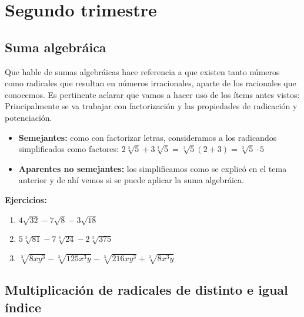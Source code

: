 \documentclass[a4paper]{article}
\begin{document}
\section{Segundo trimestre}
\subsection{Suma algebráica}
Que hable de sumas algebráicas hace referencia a que existen tanto números como radicales que resultan en números irracionales, aparte de los racionales que conocemos. Es pertinente aclarar que vamos a hacer uso de los ítems antes vistos:\\
Principalmente se va trabajar con factorización y las propiedades de radicación y potenciación.
\begin{itemize}
    \item \textbf{Semejantes:} como con factorizar letras, consideramos a los radicandos simplificados como factores: $2\sqrt[2]{5}+3\sqrt[2]{5}=\sqrt[2]{5}(2+3)=\sqrt[2]{5}\cdot 5$
    \item \textbf{Aparentes no semejantes:} los simplificamos como se explicó en el tema anterior y de ahí vemos si se puede aplicar la suma algebráica. 
\end{itemize}

\textbf{Ejercicios:}
\begin{enumerate}
    \item $4\sqrt{32}-7\sqrt{8}-3\sqrt{18}$
    \item $5\sqrt[3]{81}-7\sqrt[3]{24}-2\sqrt[3]{375}$
    \item $\sqrt[3]{8xy^3}-\sqrt[3]{125x^3y}-\sqrt[3]{216xy^3}+\sqrt[3]{8x^3y}$
\end{enumerate}
\subsection{Multiplicación de radicales de distinto e igual índice}
\end{document}
